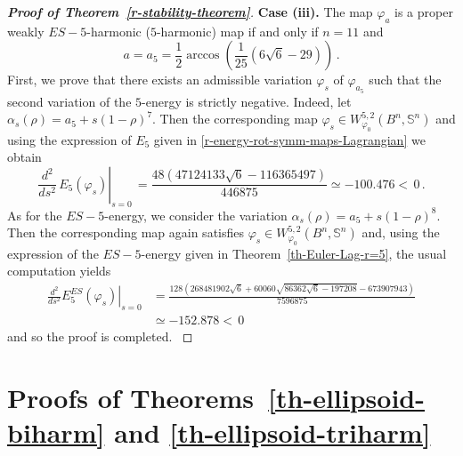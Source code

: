\documentclass[11pt]{amsart}
\theoremstyle{plain}
\theoremstyle{definition}
\numberwithin{equation}{section}
\def \s{{\mathbb S}}
\numberwithin{equation}{section}
\begin{document}
\begin{proof}[\textbf{Proof of Theorem~\ref{r-stability-theorem}}]
\noindent
\textbf{Case (iii).} The map $\varphi_a$ is a proper weakly $ES-5$-harmonic ($5$-harmonic) map if and only if $n=11$ and
\[
a=a_{5}=\dfrac{1}{2} \arccos\left(\dfrac{1}{25} \left(6\sqrt{6}-29\right)\right) \,.
\]
First, we prove that there exists an admissible variation $\varphi_s $ of $\varphi_{a_5}$ such that the second variation of the $5$-energy is strictly negative. Indeed, let $\alpha_s(\rho)=a_5+s (1-\rho)^7$. Then the corresponding map $\varphi_s\in W_{\varphi_0}^{5,2}\left ( B^n,\s^n \right )$ and using the expression of $E_5$ given in \eqref{r-energy-rot-symm-maps-Lagrangian} we obtain
\[
\left . \frac{d^2}{ds^2}\,E_5\left( \varphi_s \right ) \right |_{s=0} \,=  \frac{48 \left(47124133 \sqrt{6}-116365497\right)}{446875}\simeq -100.476 < \, 0\,.
\]
As for the $ES-5$-energy, we consider the variation  $\alpha_s(\rho)=a_5+s (1-\rho)^{8}$. Then the corresponding map again satisfies $\varphi_s\in W_{\varphi_0}^{5,2}\left ( B^n,\s^n \right )$ and, using the expression of the $ES-5$-energy given in Theorem~\ref{th-Euler-Lag-r=5}, the usual computation yields
{\small 
\[
\begin{split}
\left . \frac{d^2}{ds^2} E_5^{ES}\left( \varphi_s \right ) \right |_{s=0} &=  \frac{128 \left(268481902 \sqrt{6}+60060 \sqrt{86362 \sqrt{6}-197208}-673907943\right)}{7596875}\\
&\simeq -152.878 < \, 0
\end{split}
\]
and so the proof is completed.
}
\end{proof}


\section{Proofs of Theorems~\ref{th-ellipsoid-biharm} and \ref{th-ellipsoid-triharm}}\label{sec-ellipsoid}
\end{document}
